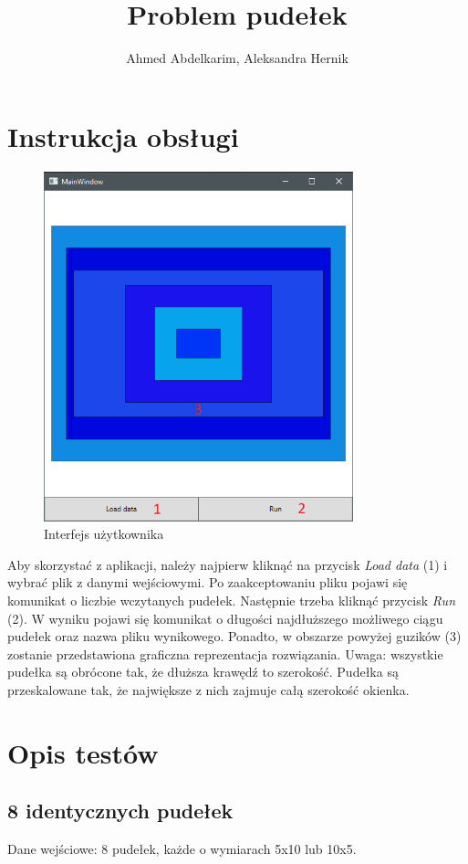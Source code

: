 \documentclass{article}
\title{Problem pudełek}
\author{Ahmed Abdelkarim, Aleksandra Hernik}
\begin{document}
\maketitle

\section{Instrukcja obsługi}
\begin{figure}[H]
\centering
\includegraphics[width=0.8\textwidth]{instrukcja.png}
\caption{Interfejs użytkownika}
\end{figure}
Aby skorzystać z aplikacji, należy najpierw kliknąć na przycisk \textit{Load data} (1) i wybrać plik z danymi wejściowymi. Po zaakceptowaniu pliku pojawi się komunikat o liczbie wczytanych pudełek. Następnie trzeba kliknąć przycisk \textit{Run} (2). W wyniku pojawi się komunikat o długości najdłuższego możliwego ciągu pudełek oraz nazwa pliku wynikowego. Ponadto, w obszarze powyżej guzików (3) zostanie przedstawiona graficzna reprezentacja rozwiązania. Uwaga: wszystkie pudełka są obrócone tak, że dłuższa krawędź to szerokość.  Pudełka są przeskalowane tak, że największe z nich zajmuje całą szerokość okienka.

\section{Opis testów}
\subsection{8 identycznych pudełek}
Dane wejściowe: 8 pudełek, każde o wymiarach 5x10 lub 10x5.
\end{document}
